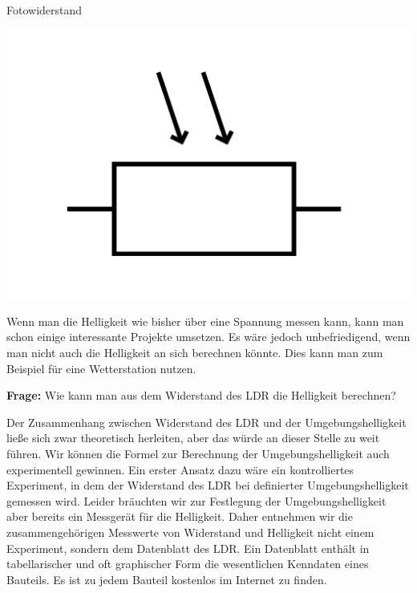 \begin{zsfg}{Fotowiderstand}
\begin{minipage}{0.28\textwidth}
\begin{minipage}{0.48\textwidth}
		\end{minipage}
		\hfill
		\begin{minipage}{0.48\textwidth}
			\centering
			\includegraphics[width=\textwidth]{./pics/ldr-schaltsymbol.png}
		\end{minipage}
	\end{minipage}
%	
\end{zsfg}

Wenn man die Helligkeit wie bisher über eine Spannung messen kann, kann man schon einige interessante Projekte umsetzen. Es wäre jedoch unbefriedigend, wenn man nicht auch die Helligkeit an sich berechnen könnte. Dies kann man zum Beispiel für eine Wetterstation nutzen.

\begin{ziel}
	\textbf{Frage:} Wie kann man aus dem Widerstand des LDR die Helligkeit berechnen?
\end{ziel}

Der Zusammenhang zwischen Widerstand des LDR und der Umgebungshelligkeit ließe sich zwar theoretisch herleiten, aber das würde an dieser Stelle zu weit führen. Wir können die Formel zur Berechnung der Umgebungshelligkeit auch experimentell gewinnen. Ein erster Ansatz dazu wäre ein kontrolliertes Experiment, in dem der Widerstand des LDR bei definierter Umgebungshelligkeit gemessen wird. Leider bräuchten wir zur Festlegung der Umgebungshelligkeit aber bereits ein Messgerät für die Helligkeit. Daher entnehmen wir die zusammengehörigen Messwerte von Widerstand und Helligkeit nicht einem Experiment, sondern dem Datenblatt des LDR. Ein Datenblatt enthält in tabellarischer und oft graphischer Form die wesentlichen Kenndaten eines Bauteils. Es ist zu jedem Bauteil kostenlos im Internet zu finden.

